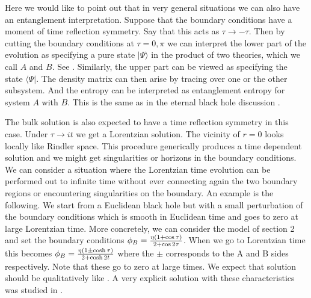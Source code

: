 Here we would like to point out that in very general situations we can also have an entanglement interpretation. Suppose that the boundary conditions have a moment of time reflection symmetry.
Say that this acts as $\tau \to -\tau$.
Then by cutting the boundary conditions at $\tau =0, \pi$ we can interpret the lower part of the evolution as
specifying a pure state $|\Psi\rangle$ in the product of two theories, which we call $A$ and $B$. See \rhoandpsi .
 Similarly, the upper part can be
viewed as specifying the state $\langle \Psi | $.  The density matrix can then arise by tracing over
one or the other subsystem. And the entropy can be interpreted as entanglement entropy for system $A$ with  $B$.
This is the same as in the eternal black hole discussion .


\ifig{} {}

The bulk solution is also expected to have a time reflection symmetry in this case.  Under $\tau \to i t$ we
get a Lorentzian solution. The vicinity of $r=0$ looks locally like Rindler space.
This procedure generically produces a time
dependent solution and we might get singularities or horizons in the boundary conditions. We can
 consider a situation where the Lorentzian time evolution can be performed out to infinite time
without ever connecting again the two boundary regions or encountering singularities on the boundary.
An example is the following.  We start from a Euclidean black hole but with a
small perturbation of the boundary conditions which is smooth in Euclidean time and goes to zero at large Lorentzian
time. More concretely,
 we can consider the model of section 2 and set the boundary conditions $\phi_B ={  \eta  (1+ \cos \tau)
\over 2 + \cos 2 \tau } $. When we go to Lorentzian time this becomes $\phi_B ={\eta (1 \pm \cosh \tau)  \over 2 + \cosh 2 t } $ where the $\pm$ corresponds to the A and B sides respectively. Note that these go to
zero at large times. We expect that solution should be qualitatively like \Lorentzian . A very
explicit solution with these characteristics was studied in   .


